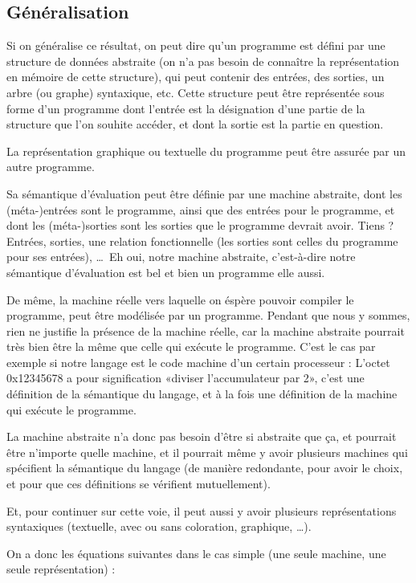 \documentclass{article}
\begin{document}
\subsection{Généralisation}
Si on généralise ce résultat, on peut dire qu'un programme est défini par une structure de données abstraite (on n'a pas besoin de connaître la représentation en mémoire de cette structure), qui peut contenir des entrées, des sorties, un arbre (ou graphe) syntaxique, etc. Cette structure peut être représentée sous forme d'un programme dont l'entrée est la désignation d'une partie de la structure que l'on souhite accéder, et dont la sortie est la partie en question.

La représentation graphique ou textuelle du programme peut être assurée par un autre programme.

Sa sémantique d'évaluation peut être définie par une machine abstraite, dont les (méta-)entrées sont le programme, ainsi que des entrées pour le programme, et dont les (méta-)sorties sont les sorties que le programme devrait avoir. Tiens ? Entrées, sorties, une relation fonctionnelle (les sorties sont celles du programme pour ses entrées), \dots\ Eh oui, notre machine abstraite, c'est-à-dire notre sémantique d'évaluation est bel et bien un programme elle aussi.

De même, la machine réelle vers laquelle on éspère pouvoir compiler le programme, peut être modélisée par un programme. Pendant que nous y sommes, rien ne justifie la présence de la machine réelle, car la machine abstraite pourrait très bien être la même que celle qui exécute le programme. C'est le cas par exemple si notre langage est le code machine d'un certain processeur : L'octet 0x12345678 a pour signification «diviser l'accumulateur par 2», c'est une définition de la sémantique du langage, et à la fois une définition de la machine qui exécute le programme.

La machine abstraite n'a donc pas besoin d'être si abstraite que ça, et pourrait être n'importe quelle machine, et il pourrait même y avoir plusieurs machines qui spécifient la sémantique du langage (de manière redondante, pour avoir le choix, et pour que ces définitions se vérifient mutuellement).

Et, pour continuer sur cette voie, il peut aussi y avoir plusieurs représentations syntaxiques (textuelle, avec ou sans coloration, graphique, \dots).

On a donc les équations suivantes dans le cas simple (une seule machine, une seule représentation) :
\end{document}

